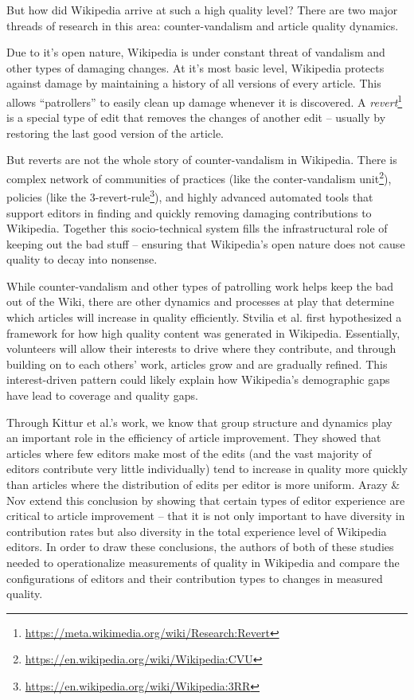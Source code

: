 But how did Wikipedia arrive at such a high quality level?  There are two major threads of research in this area: counter-vandalism and article quality dynamics.

 Due to it's open nature, Wikipedia is under constant threat of vandalism and other types of damaging changes.  At it's most basic level, Wikipedia protects against damage by maintaining a history of all versions of every article.  This allows ``patrollers'' to easily clean up damage whenever it is discovered.  A \emph{revert}\footnote{\url{https://meta.wikimedia.org/wiki/Research:Revert}} is a special type of edit that removes the changes of another edit -- usually by restoring the last good version of the article.

But reverts are not the whole story of counter-vandalism in Wikipedia.  There is complex network of communities of practices (like the conter-vandalism unit\footnote{\url{https://en.wikipedia.org/wiki/Wikipedia:CVU}}), policies (like the 3-revert-rule\footnote{\url{https://en.wikipedia.org/wiki/Wikipedia:3RR}}), and highly advanced automated tools that support editors in finding and quickly removing damaging contributions to Wikipedia\cite{geiger10work}\cite{priedhorsky07creating}.  Together this socio-technical system fills the infrastructural role of keeping out the bad stuff -- ensuring that Wikipedia's open nature does not cause quality to decay into nonsense.

 While counter-vandalism and other types of patrolling work helps keep the bad out of the Wiki, there are other dynamics and processes at play that determine which articles will increase in quality efficiently.  Stvilia et al. first hypothesized a framework for how high quality content was generated in Wikipedia\cite{stvilia08information}.   Essentially, volunteers will allow their interests to drive where they contribute, and through building on to each others' work, articles grow and are gradually refined.  This interest-driven pattern could likely explain how Wikipedia's demographic gaps have lead to coverage and quality gaps\cite{lam11clubhouse}.

Through Kittur et al.'s work, we know that group structure and dynamics play an important role in the efficiency of article improvement.  They showed that articles where few editors make most of the edits (and the vast majority of editors contribute very little individually) tend to increase in quality more quickly than articles where the distribution of edits per editor is more uniform\cite{kittur08harnessing}.  Arazy \& Nov extend this conclusion by showing that certain types of editor experience are critical to article improvement -- that it is not only important to have diversity in contribution rates but also diversity in the total experience level of Wikipedia editors\cite{arazy10determinants}.  In order to draw these conclusions, the authors of both of these studies needed to operationalize measurements of quality in Wikipedia and compare the configurations of editors and their contribution types to changes in measured quality.
